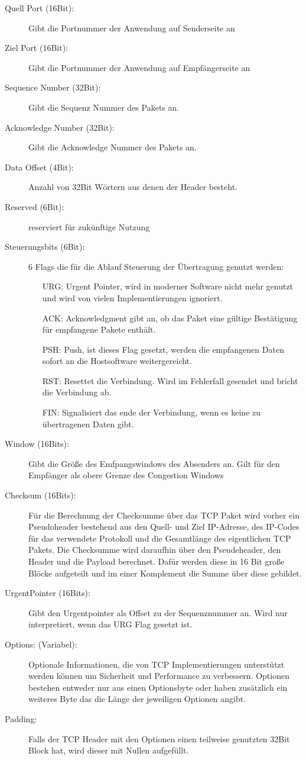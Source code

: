 \begin{description}



\item[Quell Port (16Bit): ] Gibt die Portnummer der Anwendung auf Senderseite an 
\item[Ziel Port (16Bit): ] Gibt die Portnummer der Anwendung auf Empfängerseite an
\item[Sequence Number (32Bit): ] Gibt die Sequenz Nummer des Pakets an.
\item[Acknowledge Number (32Bit): ] Gibt die Acknowledge Nummer des Pakets an.
\item[Data Offset (4Bit): ] Anzahl von 32Bit Wörtern aus denen der Header besteht. 
\item[Reserved (6Bit): ] reserviert für zukünftige Nutzung
\item[Steuerungsbits (6Bit): ] 6 Flags die für die Ablauf Steuerung der Übertragung genutzt werden: 
\begin{itemize}
\item[URG: ] Urgent Pointer, wird in moderner Software nicht mehr genutzt und wird von vielen Implementierungen ignoriert. 
\item[ACK: ] Acknowledgment gibt an, ob das Paket eine gültige Bestätigung für empfangene Pakete enthält.
\item[PSH: ] Push, ist dieses Flag gesetzt, werden die empfangenen Daten sofort an die Hostsoftware weitergereicht. 
\item[RST: ] Resettet die Verbindung. Wird im Fehlerfall gesendet und bricht die Verbindung ab. 
\item[FIN: ] Signalisiert das ende der Verbindung, wenn es keine zu übertragenen Daten gibt. 
\end{itemize}
\item[Window (16Bits): ] Gibt die Größe des Emfpangswindows des Absenders an. Gilt für den Empfänger als obere Grenze des Congestion Windows
\item[Checksum (16Bits): ] Für die Berechnung der Checksumme über das TCP Paket wird vorher ein Pseudoheader bestehend aus den Quell- und Ziel IP-Adresse, des IP-Codes für das verwendete Protokoll und die Gesamtlänge des eigentlichen TCP Pakets. Die Checksumme wird daraufhin über den Pseudeheader, den Header und die Payload berechnet. Dafür werden diese in 16 Bit große Blöcke aufgeteilt und im einer Komplement die Summe über diese gebildet. 
\item[UrgentPointer (16Bits): ] Gibt den Urgentpointer als Offset zu der Sequenznummer an. Wird nur interpretiert, wenn das URG Flag gesetzt ist.\
\item[Options: (Variabel): ]  Optionale Informationen, die von TCP Implementierungen unterstützt werden können um Sicherheit und Performance zu verbessern. Optionen bestehen entweder nur aus einen Optionsbyte oder haben zusätzlich ein weiteres Byte das die Länge der jeweiligen Optionen angibt. 
\item[Padding: ] Falls der TCP Header mit den Optionen einen teilweise genutzten 32Bit Block hat, wird dieser mit Nullen aufgefüllt. 
\end{description}

